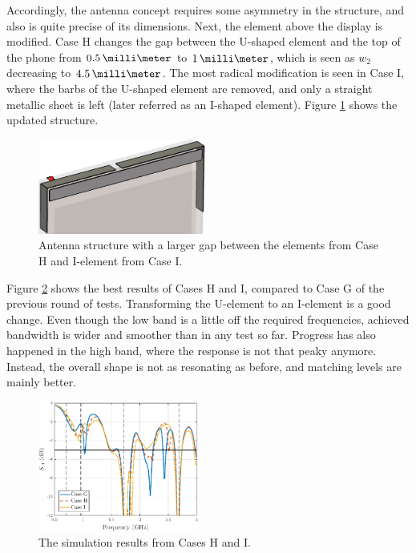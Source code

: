 Accordingly, the antenna concept requires some asymmetry in the structure, and also is quite precise of its dimensions. Next, the element above the display is modified. Case H changes the gap between the U-shaped element and the top of the phone from $0.5\,\milli\meter$ to $1\,\milli\meter$, which is seen as $w_2$ decreasing to $4.5\,\milli\meter$. The most radical modification is seen in Case I, where the barbs of the U-shaped element are removed, and only a straight metallic sheet is left (later referred as an I-shaped element). Figure \ref{fig:concept_i_shape} shows the updated structure.
\begin{figure}[H]
    \centering
    \vspace{-12pt}
    \includegraphics[width=0.49\textwidth]{img/concept_i_shape.eps}
    \caption{Antenna structure with a larger gap between the elements from Case H and I-element from Case I.}
    \label{fig:concept_i_shape}
    \vspace{-10pt}
\end{figure}


Figure \ref{fig:concept4} shows the best results of Cases H and I, compared to Case G of the previous round of tests. Transforming the U-element to an I-element is a good change. Even though the low band is a little off the required frequencies, achieved bandwidth is wider and smoother than in any test so far. Progress has also happened in the high band, where the response is not that peaky anymore. Instead, the overall shape is not as resonating as before, and matching levels are mainly better.
\begin{figure}[H]
    \vspace{-5pt}
    \centering
    \includegraphics[width=0.47\textwidth]{img/concept4.eps}
    \vspace{-3pt}
    \caption{The simulation results from Cases H and I.}
    \label{fig:concept4}
    \vspace{-15pt}
\end{figure}

